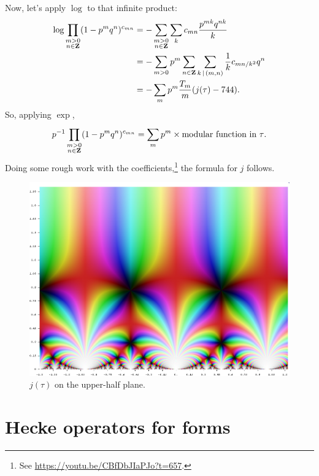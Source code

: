 \documentclass[11pt, oneside,margin=1in]{article}
\begin{document}
Now, let's apply $\log$ to that infinite product:
\begin{align*}
	\log \prod_{\substack{ m > 0\\n\in \mathbf Z}} (1-p^mq^n)^{c_{mn}} &= - \sum_{\substack{m>0\\n\in \mathbf Z}}^{} \sum_{k}^{} c_{mn} \frac{p^{ m k} q^{nk}}{k}\\
								    &= -\sum_{m>0}^{} p^m \sum_{n\in \mathbf Z}^{} \sum_{k\,\mid\,(m,n)}^{} \frac{1}{k} c_{mn/k^2}q^n\\
								    &= - \sum_{m}^{} p^m \frac{T_m}{m}(j(\tau)- 744).
\end{align*}
So, applying $\exp$,
\begin{align*}
	p^{-1} \prod_{\substack{ m > 0\\n\in \mathbf Z}} (1-p^mq^n)^{c_{mn}} = \sum_{m}^{} p^m \times \textrm{modular function in $\tau$}. 
\end{align*}
Doing some rough work with the coefficients,\footnote{See \url{https://youtu.be/CBfDbJIaPJo?t=657}.} the formula for $j$ follows.
\begin{figure}
	\begin{center}
		\includegraphics[scale = 0.4]{j}
                \caption{$j(\tau)$ on the upper-half plane.}
	\end{center}
\end{figure}

\section{Hecke operators for forms}
\end{document}
